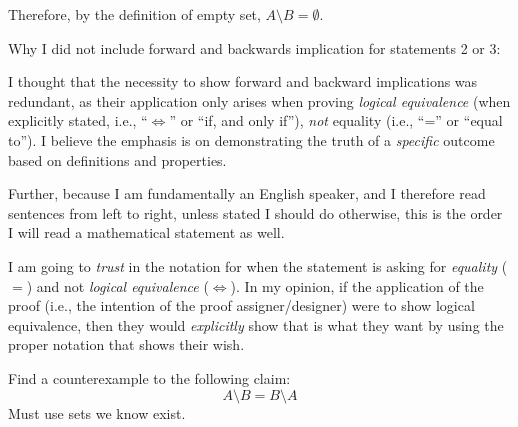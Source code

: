 {\begin{enumerate}
\begin{itemize}
                Therefore, by the definition of empty set, \(A\setminus B = \emptyset\). 
            \end{itemize}
        \end{enumerate}
    }

        Why I did not include forward and backwards implication for statements 2 or 3:

        I thought that the necessity to show forward and backward implications was redundant, as their application only arises when proving \textit{logical equivalence} (when explicitly stated, i.e., ``\(\iff\)'' or ``if, and only if''), \textit{not} equality (i.e., ``='' or ``equal to''). I believe the emphasis is on demonstrating the truth of a \textit{specific} outcome based on definitions and properties.
    
        Further, because I am fundamentally an English speaker, and I therefore read sentences from left to right, unless stated I should do otherwise, this is the order I will read a mathematical statement as well.
    
        I am going to \textit{trust} in the notation for when the statement is asking for \textit{equality} (\(=\)) and not \textit{logical equivalence} (\(\iff\)). In my opinion, if the application of the proof (i.e., the intention of the proof assigner/designer) were to show logical equivalence, then they would \textit{explicitly} show that is what they want by using the proper notation that shows their wish.

    



    


    \begin{exercise}
        {}Find a counterexample to the following claim: \[A\setminus B = B\setminus A\] 
        Must use sets we know exist.
    \end{exercise}

